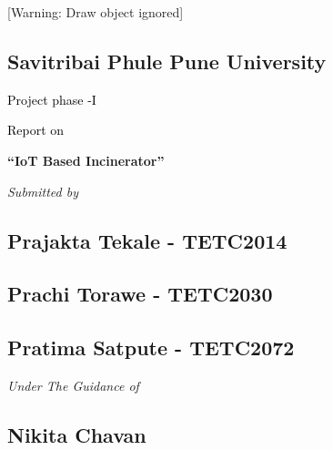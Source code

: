 \documentclass[letterpaper]{article}
\title{}
\author{}
\date{}
\begin{document}
\clearpage\setcounter{page}{1}\pagestyle{Standard}
[Warning: Draw object ignored]


\bigskip


\bigskip


\bigskip


\bigskip


\bigskip

\subsection[Savitribai Phule Pune University]{\textcolor[rgb]{0.43529412,0.18431373,0.62352943}{Savitribai Phule Pune
University}}

\bigskip


\bigskip

{\centering
\textcolor{black}{Project phase -I}
\par}

{\centering
\textcolor{black}{Report on}
\par}


\bigskip

{\centering
\textbf{\textcolor[rgb]{0.0,0.4392157,0.7529412}{{}``IoT Based Incinerator''}}
\par}

{\centering
\textit{Submitted by}
\par}

\subsection[Prajakta Tekale {}- TETC2014]{\textcolor[rgb]{0.0,0.12156863,0.37254903}{Prajakta Tekale - TETC2014}}
\subsection[Prachi Torawe {}- TETC2030]{\textcolor[rgb]{0.0,0.12156863,0.37254903}{Prachi Torawe - TETC2030}}
\subsection[Pratima Satpute {}- TETC2072]{\textcolor[rgb]{0.0,0.12156863,0.37254903}{Pratima Satpute - TETC2072}}

\bigskip

{\centering
\textit{Under The Guidance of}
\par}

\subsection[Nikita Chavan]{\textcolor[rgb]{0.43529412,0.18431373,0.62352943}{Nikita Chavan}}
\end{document}
